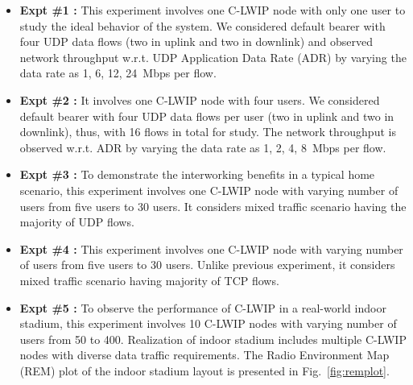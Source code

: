 \documentclass[conference]{IEEEtran}
\begin{document}
\begin{itemize}
\item \textbf{Expt \#1 :} This experiment involves one C-LWIP node with only one user to study the ideal behavior of the system. We considered default bearer with four UDP data flows (two in uplink and two in downlink) and observed network throughput w.r.t. UDP Application Data Rate (ADR) by varying the data rate as 1, 6, 12, 24~Mbps per flow.
\item \textbf{Expt \#2 :} It involves one C-LWIP node with four users. We considered default bearer with four UDP data flows per user (two in uplink and two in downlink), thus, with 16 flows in total for study. The network throughput is observed w.r.t. ADR by varying the data rate as 1, 2, 4, 8~Mbps per flow.
\item \textbf{Expt \#3 :} To demonstrate the interworking benefits in a typical home scenario, this experiment involves one C-LWIP node with varying number of users from five users to 30 users. It considers mixed traffic scenario having the majority of UDP flows. 
\item \textbf{Expt \#4 :} This experiment involves one C-LWIP node with varying number of users from five users to 30 users. Unlike previous experiment, it considers mixed traffic scenario having majority of TCP flows.
\item \textbf{Expt \#5 :} To observe the performance of C-LWIP in a real-world indoor stadium, this experiment involves 10 C-LWIP nodes with varying number of users from 50 to 400. Realization of indoor stadium includes multiple C-LWIP nodes with diverse data traffic requirements. The Radio Environment Map (REM) plot of the indoor stadium layout is presented in Fig.~\ref{fig:remplot}.
\end{itemize}
\end{document}
